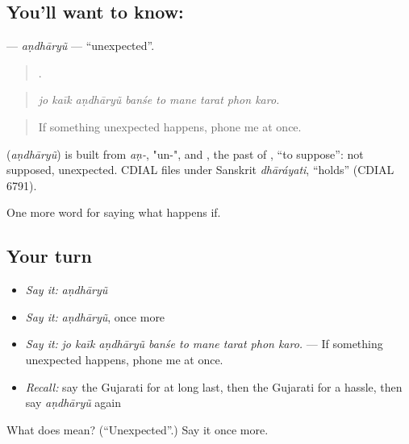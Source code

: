 \subsection*{You'll want to know: }
\textbf{} — \emph{aṇdhāryũ} — \textquotedblleft{}unexpected\textquotedblright{}.

\begin{quote}
        .
\end{quote}

\begin{quote}
\emph{jo kaīk aṇdhāryũ banśe to mane tarat phon karo.}
\end{quote}

\begin{quote}
If something unexpected happens, phone me at once.
\end{quote}

\begin{cousinweb}
\textbf{} (\emph{aṇdhāryũ}) is built from \emph{aṇ-}, "un-", and \textbf{}, the past of \textbf{}, \textquotedblleft{}to suppose\textquotedblright{}: not supposed, unexpected. CDIAL files \textbf{} under Sanskrit \emph{dhāráyati}, \textquotedblleft{}holds\textquotedblright{} (CDIAL 6791).
\end{cousinweb}

\begin{grammarlens}[title={What you've built}]
One more word for saying what happens if.
\end{grammarlens}

\subsection*{Your turn}
\begin{itemize}
\raggedright
  \item \emph{Say it:} \emph{aṇdhāryũ}
  \item \emph{Say it:} \emph{aṇdhāryũ}, once more
  \item \emph{Say it:} \emph{jo kaīk aṇdhāryũ banśe to mane tarat phon karo.} — If something unexpected happens, phone me at once.
  \item \emph{Recall:} say the Gujarati for at long last, then the Gujarati for a hassle, then say \emph{aṇdhāryũ} again
\end{itemize}

\begin{tcolorbox}[breakable,colback=teal!4,colframe=teal!35!black,title={Before you move on}]
What does  mean? (\textquotedblleft{}Unexpected\textquotedblright{}.) Say it once more.
\end{tcolorbox}
